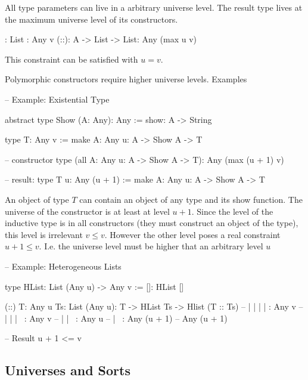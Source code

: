 All type parameters can live in a arbitrary universe level. The result type
lives at the maximum universe level of its constructors.
\begin{alba}
    []:   List : Any v
    (::): A -> List -> List: Any (max u v)
\end{alba}
This constraint can be satisfied with $u = v$.

Polymorphic constructors require higher universe levels. Examples

\begin{alba}
    -- Example: Existential Type

    abstract type Show (A: Any): Any :=
        show: A -> String

    type T: Any v :=
        make {A: Any u}: A -> Show A -> T

    -- constructor type
    (all {A: Any u}: A -> Show A -> T): Any (max (u + 1) v)

    -- result:
    type T {u}: Any (u + 1) :=
        make {A: Any u}: A -> Show A -> T

\end{alba}
An object of type $T$ can contain an object of any type and its show function.
The universe of the constructor is at least at level $u + 1$. Since the level of
the inductive type is in all constructors (they must construct an object of the
type), this level is irrelevant $v \le v$. However the other level poses a real
constraint $u + 1 \le v$. I.e. the universe level must be higher that an
arbitrary level $u$

\begin{alba}
    -- Example: Heterogeneous Lists

    type HList: List (Any u) -> Any v :=
        []:  HList []

        (::) {T: Any u} {Ts: List (Any u)}: T -> HList Ts -> Hlist (T :: Ts)
        --         |             |          |      |             : Any v
        --         |             |          |      \ : Any v
        --         |             |          \ : Any u
        --         |             \ : Any (u + 1)
        --         \: Any (u + 1)

    -- Result
    u + 1 <= v
\end{alba}




\subsection{Universes and Sorts}


